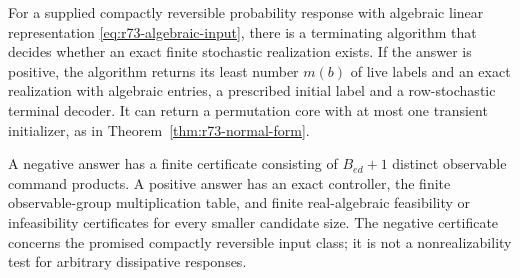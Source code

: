 \begin{theorem}
\label{thm:r73-algebraic-synthesis}
For a supplied compactly reversible probability response with algebraic
linear representation \eqref{eq:r73-algebraic-input}, there is a terminating
algorithm that decides whether an exact finite stochastic realization
exists. If the answer is positive, the algorithm returns its least number
$m(b)$ of live labels and an exact realization with algebraic entries,
a prescribed initial label and a row-stochastic terminal decoder. It can
return a permutation core with at most one transient initializer, as in
Theorem~\ref{thm:r73-normal-form}.

A negative answer has a finite certificate consisting of $B_{ed}+1$
distinct observable command products. A positive answer has an exact
controller, the finite observable-group multiplication table, and finite
real-algebraic feasibility or infeasibility certificates for every smaller
candidate size. The negative certificate concerns the promised compactly
reversible input class; it is not a nonrealizability test for arbitrary
dissipative responses.
\end{theorem}
